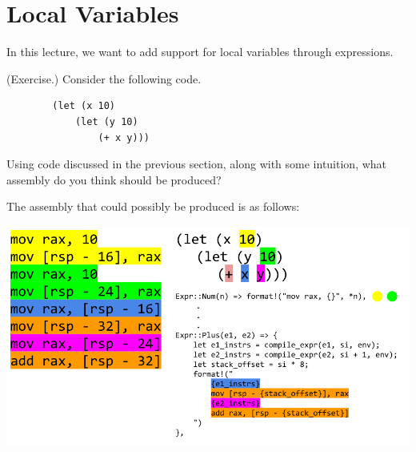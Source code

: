 \documentclass[letterpaper]{article}
\begin{document}
\section{Local Variables}
In this lecture, we want to add support for local variables through  expressions. 

\begin{mdframed}
    (Exercise.) Consider the following code.
    \begin{verbatim}
        (let (x 10)
            (let (y 10)
                (+ x y)))\end{verbatim}
    Using code discussed in the previous section, along with some intuition, what assembly do you think should be produced?

    \begin{mdframed}
    \end{mdframed}
    The assembly that could possibly be produced is as follows:
    \begin{center}
        \includegraphics[scale=0.45]{../assets/let_intro_asm.png}
    \end{center}
    

\end{mdframed}
\end{document}
